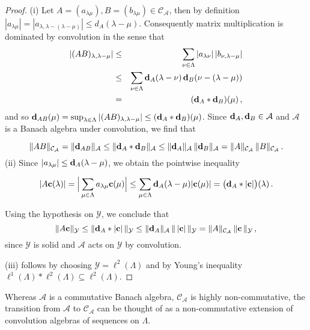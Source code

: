 \documentclass[12pt]{amsart}
\theoremstyle{definition}
\theoremstyle{remark}
\numberwithin{equation}{section}
\def\cA{\mathcal{A}}
\def\cY{\mathcal{Y}}
\def\cca{\Cal C_\ac}
\def\cA{\mathcal{A}}
\newcommand{\bbc}{{\bf c}}
\newcommand{\bbd}{{\bf d}}
\newcommand{\Cal}{\mathcal}
\newcommand{\la}{\lambda}
\newcommand{\La}{\Lambda}
\newcommand{\ac}{\Cal A}
\begin{document}
\begin{proof}
(i) Let $A= (a_{\la\mu}), B= (b_{\la\mu})\in \cca $, then by
definition $|a_{\la\mu}| = |a_{\la,\la-(\la-\mu)}| \leq d_A
(\la-\mu) $. Consequently matrix multiplication is dominated by
convolution in the sense that
\begin{eqnarray*}
|(AB)_{\la, \la-\mu}| &\leq &\sum _{\nu\in \La } |a_{\la\nu} | \,
|b_{\nu,\la-\mu}|
\\&\leq &  \sum _{\nu\in \La } \bbd_A( \la-\nu)  \, \bbd_B(\nu-(\la-\mu))      \\
&=& (\bbd_A \ast \bbd_B)(\mu) \, ,
\end{eqnarray*}
and so $\bbd_{AB}(\mu) = \sup _{\la\in \La } |(AB)_{\la,\la-\mu}|
\leq (\bbd_A \ast \bbd_B)(\mu)$. Since $\bbd_A, \bbd_B\in \cA $
and $\cA $ is a Banach algebra under convolution, we find that

$$
 \|AB\|_{\cca }  = \|\bbd_{AB}\|_{\cA } \leq \|\bbd_A \ast
\bbd_B\|_{\cA } \leq \|\bbd_A \|_{\cA } \, \| \bbd_B \|_{\cA } =
\|A\|_{\cca }\, \|B\|_{\cca } \,. $$ (ii) Since $|a_{\la\mu}| \le
\bbd_A (\la-\mu) $, we obtain the pointwise inequality

$$ |A\mathbf{c}(\la)|   = \Big|\sum _{\mu\in \La } a_{\la\mu}
\bbc(\mu) \Big| \leq \sum _{\mu\in \La } \bbd_A (\la-\mu)
|\bbc(\mu)| = \big( \bbd_A \ast |\mathbf{c}|\big) (\la) \, . $$

Using the hypothesis on $\cY$, we conclude that
\begin{equation*}
\|A\mathbf{c}\|_\cY \leq \|\bbd_A \ast |\mathbf{c}| \, \|_\cY \leq
\|\bbd_A \|_{\cA } \, \| \, |\mathbf{c}| \, \|_\cY  = \|A\|_{\cca
} \, \|\mathbf{c} \, \|_\cY  \, ,
\end{equation*}
since $\cY$ is solid and $\cA $ acts on $\cY$ by convolution.

(iii) follows by choosing $\cY=\ell ^2(\La )$ and by Young's
inequality $\ell ^1(\La) \ast \ell ^2(\La) \subseteq \ell
^2(\La)$.
\end{proof}


Whereas $\cA $ is a commutative Banach algebra,  $\cca $ is highly
non-commutative, the transition from $\cA $ to $\cca $  can be
thought of as a non-commutative extension of convolution algebras
of sequences on $\La $.
\end{document}
